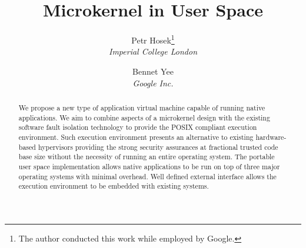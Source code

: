 \documentclass[twocolumn,10pt]{article}
\begin{document}
\title{\bf Microkernel in User Space}
\author{
Petr Hosek\footnote{The author conducted this work while employed by
Google.}\\\textit{Imperial College London}
\and Bennet Yee\\\textit{Google Inc.}
}
\date{}
\maketitle
\thispagestyle{empty}

\begin{abstract}
We propose a new type of application virtual machine capable of running
native applications. We aim to combine aspects of a microkernel design
with the existing software fault isolation technology to provide the
POSIX compliant execution environment. Such execution environment
presents an alternative to existing hardware-based hypervisors providing
the strong security assurances at fractional trusted code base size
without the necessity of running an entire operating system. The
portable user space implementation allows native applications to be run
on top of three major operating systems with minimal overhead. Well
defined external interface allows the execution environment to be
embedded with existing systems.




\end{abstract}








{
  
  
}
\end{document}
